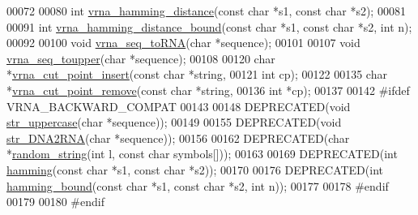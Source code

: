 \begin{DoxyCode}
00072 
00080 \textcolor{keywordtype}{int} \hyperlink{group__string__utils_ga301798b43b6f66687985c725efd14f32}{vrna\_hamming\_distance}(\textcolor{keyword}{const} \textcolor{keywordtype}{char} *s1, \textcolor{keyword}{const} \textcolor{keywordtype}{char} *s2);
00081 
00091 \textcolor{keywordtype}{int} \hyperlink{group__string__utils_ga5d1c2271e79d9bcb52d4e68360763fb9}{vrna\_hamming\_distance\_bound}(\textcolor{keyword}{const} \textcolor{keywordtype}{char} *s1, \textcolor{keyword}{const} \textcolor{keywordtype}{char} *s2, \textcolor{keywordtype}{int} n);
00092 
00100 \textcolor{keywordtype}{void} \hyperlink{group__string__utils_gacfed92cba77064f6c743f9118d079bfc}{vrna\_seq\_toRNA}(\textcolor{keywordtype}{char} *sequence);
00101 
00107 \textcolor{keywordtype}{void} \hyperlink{group__string__utils_ga4f44dca03c9d708d68e64c0610bb9091}{vrna\_seq\_toupper}(\textcolor{keywordtype}{char} *sequence);
00108 
00120 \textcolor{keywordtype}{char} *\hyperlink{group__string__utils_ga74f05ece32ea73b59f84a7452afd5fae}{vrna\_cut\_point\_insert}(\textcolor{keyword}{const} \textcolor{keywordtype}{char} *\textcolor{keywordtype}{string},
00121                             \textcolor{keywordtype}{int} cp);
00122 
00135 \textcolor{keywordtype}{char} *\hyperlink{group__string__utils_ga1fbd821d4408cc5f1dd9d12c15e092cb}{vrna\_cut\_point\_remove}(\textcolor{keyword}{const} \textcolor{keywordtype}{char} *\textcolor{keywordtype}{string},
00136                             \textcolor{keywordtype}{int} *cp);
00137 
00142 \textcolor{preprocessor}{#ifdef  VRNA\_BACKWARD\_COMPAT}
00143 
00148 DEPRECATED(\textcolor{keywordtype}{void}  \hyperlink{string__utils_8h_a17b796b806f96b70382077fb5bc519bb}{str\_uppercase}(\textcolor{keywordtype}{char} *sequence));
00149 
00155 DEPRECATED(\textcolor{keywordtype}{void} \hyperlink{string__utils_8h_ad3f18dd83f958f18b2f26ecb99305208}{str\_DNA2RNA}(\textcolor{keywordtype}{char} *sequence));
00156 
00162 DEPRECATED(\textcolor{keywordtype}{char} *\hyperlink{string__utils_8h_a1b95eac365a021572e1c37e5993a89be}{random\_string}(\textcolor{keywordtype}{int} l, \textcolor{keyword}{const} \textcolor{keywordtype}{char} symbols[]));
00163 
00169 DEPRECATED(\textcolor{keywordtype}{int} \hyperlink{string__utils_8h_ad9dc7bfc9aa664dc6698f17ce07fc7e7}{hamming}(\textcolor{keyword}{const} \textcolor{keywordtype}{char} *s1, \textcolor{keyword}{const} \textcolor{keywordtype}{char} *s2));
00170 
00176 DEPRECATED(\textcolor{keywordtype}{int} \hyperlink{string__utils_8h_a96d3c36717d624514055ce201cab1542}{hamming\_bound}(\textcolor{keyword}{const} \textcolor{keywordtype}{char} *s1, \textcolor{keyword}{const} \textcolor{keywordtype}{char} *s2, \textcolor{keywordtype}{int} n));
00177 
00178 \textcolor{preprocessor}{#endif}
00179 
00180 \textcolor{preprocessor}{#endif}
\end{DoxyCode}

